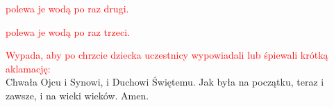 \documentclass[11pt, a5paper]{extarticle}
\begin{document}
\begin{Parallel}[v]{0.485\textwidth}{0.485\textwidth}
\end{Parallel}

\begin{center}
\textcolor{red}{polewa je wodą po raz drugi.}
\end{center}

\begin{Parallel}[v]{0.485\textwidth}{0.485\textwidth}
\end{Parallel}

\begin{center}
\textcolor{red}{polewa je wodą po raz trzeci.}
\end{center}


\textcolor{red}{Wypada, aby po chrzcie dziecka uczestnicy wypowiadali lub śpiewali krótką aklamację:}\\
Chwała Ojcu i Synowi, i Duchowi Świętemu. Jak była na początku, teraz i zawsze, i na wieki wieków. Amen.
\end{document}
